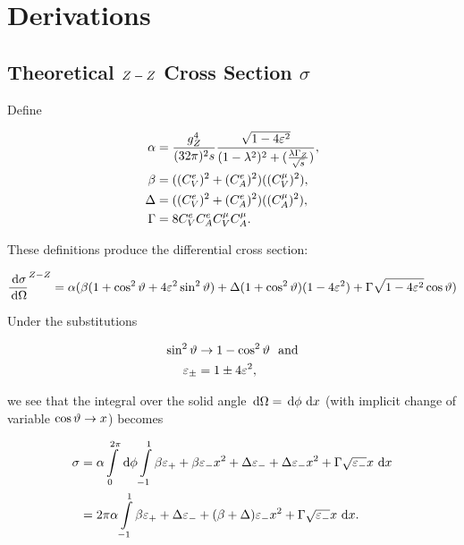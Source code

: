 \documentclass[]{report}
\begin{document}
\tableofcontents

\chapter{Derivations}

\section{Theoretical $Z -Z $ Cross Section $\sigma$}

Define

\begin{align*}
\alpha &= \frac{g_{\Zzero}^{4}}{(32\pi)^{2}s} \frac{\sqrt{1-4\varepsilon^{2}}}{(1-\lambda^{2})^{2} + (\frac{\lambda\Gamma_{\Zzero}}{\rts})},
\\
\beta &= ((C_{V}^{e})^{2} + (C_{A}^{e})^{2})((C_{V}^{\mu})^{2}),
\\
\Delta &= ((C_{V}^{e})^{2} + (C_{A}^{e})^{2})((C_{A}^{\mu})^{2}),
\\
\Gamma &= 8C_{V}^{e}C_{A}^{e}C_{V}^{\mu}C_{A}^{\mu}.
\end	{align*}

These definitions produce the differential cross section:

$$
\frac{\,\operatorname{d}\!{\sigma}}{\,\operatorname{d}\!{\Omega}}^{Z -Z }
  = \alpha(\beta(1+\cos^{2}{\vartheta}+4\varepsilon^{2}\sin^{2}{\vartheta})
    + \Delta(1+\cos^{2}{\vartheta})(1-4\varepsilon^{2})
    + \Gamma\sqrt{1-4\varepsilon^{2}}\cos{\vartheta}
  )
$$

Under the substitutions

\begin{align*}
\sin^{2}{\vartheta} &\rightarrow 1-\cos^{2}{\vartheta} \,\,\,\,\rm{and}\\
\varepsilon_{\pm} &= 1\pm4\varepsilon^{2},
\end{align*}

we see that the integral over the solid angle $\,\operatorname{d}\!{\Omega} = \,\operatorname{d}\!{\phi}\,\operatorname{d}\!{x}$ (with implicit change of variable $\cos{\vartheta}\rightarrow x$) becomes

\begin{align*}
\sigma &= \alpha\int\limits_{0}^{2\pi}\d{\phi}\int\limits_{-1}^{1}
  \beta\varepsilon_{+} + \beta\varepsilon_{-}x^{2} + \Delta\varepsilon_{-}
  + \Delta\varepsilon_{-}x^{2} + \Gamma\sqrt{\varepsilon_{-}}x
  \d{x}
  \\
  &= 2\pi\alpha\int\limits_{-1}^{1}
    \beta\varepsilon_{+} + \Delta\varepsilon_{-} + (\beta + \Delta)\varepsilon_{-}x^{2}
    + \Gamma\sqrt{\varepsilon_{-}}x
    \d{x}.
\end{align*}
\end{document}
